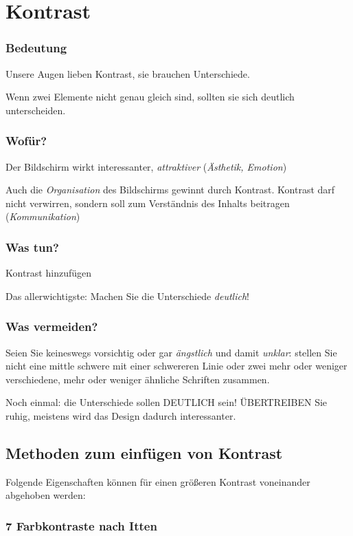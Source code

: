 \section{Kontrast}
\subsubsection*{Bedeutung}
Unsere Augen lieben Kontrast, sie brauchen Unterschiede.

Wenn zwei Elemente nicht genau gleich sind, sollten sie sich deutlich unterscheiden.

\subsubsection*{Wofür?}
Der Bildschirm wirkt interessanter, \emph{attraktiver} (\emph{Ästhetik, Emotion})

Auch die \emph{Organisation} des Bildschirms gewinnt durch Kontrast. Kontrast darf nicht verwirren, sondern soll zum Verständnis des Inhalts beitragen (\emph{Kommunikation})

\subsubsection*{Was tun?}
Kontrast hinzufügen

Das allerwichtigste: Machen Sie die Unterschiede \emph{deutlich}!

\subsubsection*{Was vermeiden?}
Seien Sie keineswegs vorsichtig oder gar \emph{ängstlich} und damit \emph{unklar}: stellen Sie nicht eine mittle schwere mit einer schwereren Linie oder zwei mehr oder weniger verschiedene, mehr oder weniger ähnliche Schriften zusammen.
 
Noch einmal: die Unterschiede sollen DEUTLICH sein! ÜBERTREIBEN Sie ruhig, meistens wird das Design dadurch interessanter.

\subsection{Methoden zum einfügen von Kontrast}
Folgende Eigenschaften können für einen größeren Kontrast voneinander abgehoben werden:

\subsubsection{7 Farbkontraste nach Itten}

